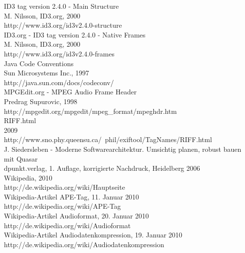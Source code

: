 \begin{thebibliography}{9999999999999}
	 ID3 tag version 2.4.0 - Main Structure\\
	M. Nilsson, ID3.org, 2000\\
	http://www.id3.org/id3v2.4.0-structure\\

	 ID3.org - ID3 tag version 2.4.0 - Native Frames\\
	M. Nilsson, ID3.org, 2000\\
	http://www.id3.org/id3v2.4.0-frames\\

	 Java Code Conventions\\
	Sun Microsystems Inc., 1997\\
	http://java.sun.com/docs/codeconv/\\

	 MPGEdit.org - MPEG Audio Frame Header\\
	Predrag Supurovic, 1998\\
	http://mpgedit.org/mpgedit/mpeg\_format/mpeghdr.htm\\
	
	 RIFF.html\\
	2009\\
	http://www.sno.phy.queensu.ca/~phil/exiftool/TagNames/RIFF.html\\
	
	 J. Siedersleben - Moderne Softwarearchitektur. Umsichtig planen, robust bauen mit Quasar\\
	dpunkt.verlag, 1. Auflage, korrigierte Nachdruck, Heidelberg 2006\\

	 Wikipedia, 2010\\
	http://de.wikipedia.org/wiki/Hauptseite\\

	 Wikipedia-Artikel APE-Tag, 11. Januar 2010\\
	http://de.wikipedia.org/wiki/APE-Tag\\

	 Wikipedia-Artikel Audioformat, 20. Januar 2010\\
	http://de.wikipedia.org/wiki/Audioformat\\

	 Wikipedia-Artikel Audiodatenkompression, 19. Januar 2010\\
	http://de.wikipedia.org/wiki/Audiodatenkompression\\


\end{thebibliography}
